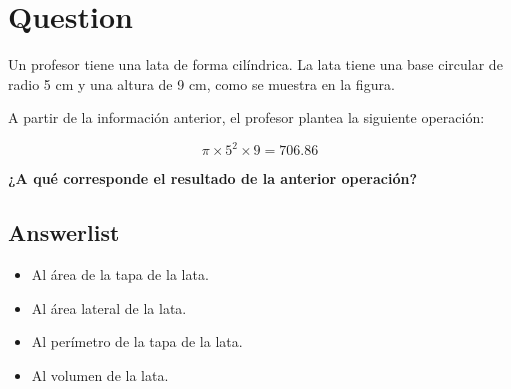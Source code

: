 \documentclass[
]{article}
\author{}
\date{\vspace{-2.5em}}
\providecommand{\tightlist}{%
  \setlength{\itemsep}{0pt}\setlength{\parskip}{0pt}}
\begin{document}
\section{Question}\label{question}

Un profesor tiene una lata de forma cilíndrica. La lata tiene una base
circular de radio 5 cm y una altura de 9 cm, como se muestra en la
figura.

\begin{center}
\end{center}

A partir de la información anterior, el profesor plantea la siguiente
operación:

\[\pi \times 5^2 \times 9 = 706.86\]

\textbf{¿A qué corresponde el resultado de la anterior operación?}

\subsection{Answerlist}\label{answerlist}

\begin{itemize}
\tightlist
\item
  Al área de la tapa de la lata.
\item
  Al área lateral de la lata.
\item
  Al perímetro de la tapa de la lata.
\item
  Al volumen de la lata.
\end{itemize}
\end{document}
